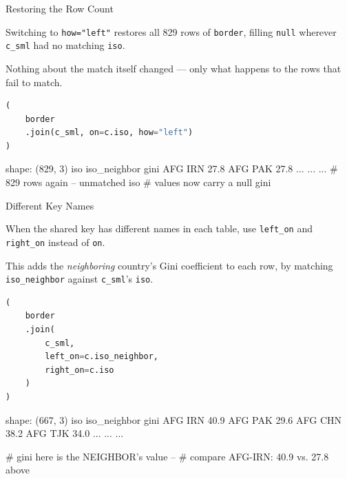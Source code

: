 \documentclass[8pt,aspectratio=169]{beamer}
\begin{document}
\begin{frame}[fragile]{Restoring the Row Count}
\begin{splitcode}{%

Switching to \texttt{how="left"} restores all 829 rows of \texttt{border}, filling \texttt{null} wherever \texttt{c\_sml} had no matching \texttt{iso}.

Nothing about the match itself changed --- only what happens to the rows that fail to match.

}
\begin{lstlisting}[language=Python]
(
    border
    .join(c_sml, on=c.iso, how="left")
)
\end{lstlisting}
\begin{codeoutput}
shape: (829, 3)
iso  iso_neighbor  gini
AFG  IRN           27.8
AFG  PAK           27.8
...  ...           ...
# 829 rows again -- unmatched iso
# values now carry a null gini
\end{codeoutput}
\end{splitcode}
\end{frame}

\begin{frame}[fragile]{Different Key Names}
\begin{splitcode}{%

When the shared key has different names in each table, use \texttt{left\_on} and \texttt{right\_on} instead of \texttt{on}.

This adds the \textit{neighboring} country's Gini coefficient to each row, by matching \texttt{iso\_neighbor} against \texttt{c\_sml}'s \texttt{iso}.

}
\begin{lstlisting}[language=Python]
(
    border
    .join(
        c_sml,
        left_on=c.iso_neighbor,
        right_on=c.iso
    )
)
\end{lstlisting}
\begin{codeoutput}
shape: (667, 3)
iso  iso_neighbor  gini
AFG  IRN           40.9
AFG  PAK           29.6
AFG  CHN           38.2
AFG  TJK           34.0
...  ...           ...

# gini here is the NEIGHBOR's value --
# compare AFG-IRN: 40.9 vs. 27.8 above
\end{codeoutput}
\end{splitcode}
\end{frame}
\end{document}
